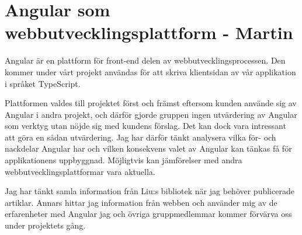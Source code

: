 \section{Angular som webbutvecklingsplattform - Martin}

Angular är en plattform för front-end delen av webbutvecklingsprocessen. Den kommer under vårt projekt användas för att skriva klientsidan av vår applikation i språket TypeScript.

Plattformen valdes till projektet först och främst eftersom kunden använde sig av Angular i andra projekt, och därför gjorde gruppen ingen utvärdering av Angular som verktyg utan nöjde sig med kundens förslag. Det kan dock vara intressant att göra en sådan utvärdering. Jag har därför tänkt analysera vilka för- och nackdelar Angular har och vilken konsekvens valet av Angular kan tänkas få för applikationens uppbyggnad. Möjligtvis kan jämförelser med andra webbutvecklingsplattformar vara aktuella.

Jag har tänkt samla information från Liu:s bibliotek när jag behöver publicerade artiklar. Annars hittar jag information från webben och använder mig av de erfarenheter med Angular jag och övriga gruppmedlemmar kommer förvärva oss under projektets gång.

